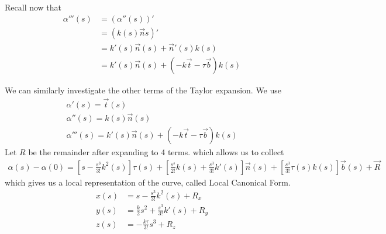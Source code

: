 \documentclass{article}
\begin{document}
Recall now that
\begin{align*}
    \alpha'''(s) &= (\alpha''(s))'\\
    &=(k(s) \vec{n}s)'\\
    &=k'(s)\vec{n}(s) + \vec{n}'(s)k(s) \\
    &=k'(s)\vec{n}(s) + (-k\vec{t} - \tau \vec{b})k(s)
\end{align*}

We can similarly investigate the other terms of the Taylor expansion. We use 
\begin{align*}
    \alpha'(s) = \vec{t}(s)\\
    \alpha''(s) = k(s)\vec{n}(s)\\
    \alpha'''(s) = k'(s)\vec{n}(s) + (-k\vec{t} - \tau \vec{b})k(s)
\end{align*}
Let $R$ be the remainder after expanding to 4 terms.
which allows us to collect
\begin{align*}
    \alpha(s) - \alpha(0) = \left[ s - \frac{s^3}{3!}k^2(s)\right]\tau(s) +
    \left[\frac{s^s}{2!}k(s) +  \frac{s^3}{3!}k'(s)\right]\vec{n}(s) +
    \left[\frac{s^3}{3!}\tau(s)k(s)\right]\vec{b}(s) + \vec{R}
\end{align*}
which gives us a local representation of the curve, called Local Canonical Form.
\begin{align*}
    x(s) &= s - \frac{s^3}{3!}k^2(s) + R_x \\
    y(s) &= \frac{k}{2}s^2 + \frac{s^3}{3!}k'(s) + R_y \\
    z(s) &= -\frac{k\tau}{3!}s^3 + R_z
\end{align*}
\end{document}
